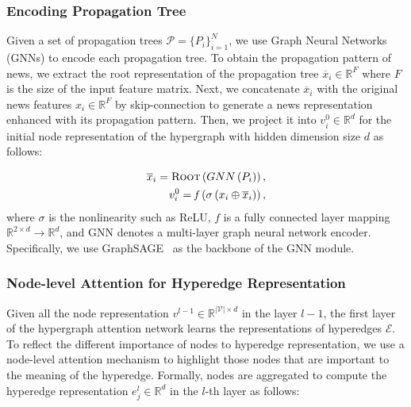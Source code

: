 \documentclass[conference]{IEEEtran}
\begin{document}
\subsubsection{Encoding Propagation Tree}
Given a set of propagation trees $\mathcal{P}=\{P_i\}_{i=1}^{\textit{N}}$, we use Graph Neural Networks (GNNs) to  encode each propagation tree. To obtain the propagation pattern of news, we extract the root representation of the propagation tree $\overline{x}_i \in \mathbb{R}^{\mathit{F}}$ where $\mathit{F}$ is the size of the input feature matrix. Next, we concatenate  $\overline{x}_i$ with the original news features $x_i \in \mathbb{R}^{\mathit{F}} $ by skip-connection to generate a news representation enhanced with its propagation pattern. Then, we project it into $v^0_i \in \mathbb{R}^{d}$ for the initial node representation of the hypergraph with hidden dimension size $\mathit{d}$ as follows: 

\begin{equation}
\begin{aligned}
\overline{x}_i =  \textsc{Root}\left(GNN\left( P_i \right)\right),\\
    v^{0}_{i} = \mathit{f} \left(\sigma \left( x_i \oplus\overline{x}_i \right)\right),
\end{aligned}
\end{equation}
where $\sigma$ is the nonlinearity such as ReLU, $\textit{f}$ is a fully connected layer mapping $\mathbb{R}^{2 \times  \mathit{d}} \rightarrow \mathbb{R}^{ \mathit{d}}$, and GNN denotes a multi-layer graph neural network encoder. Specifically, we use GraphSAGE~\cite{hamilton2017inductive} as the backbone of the GNN module.

\subsubsection{Node-level Attention for Hyperedge Representation}
Given all the node representation $v^{l-1} \in \mathbb{R}^{|\mathcal{V}|\times \mathit{d}}$ in the layer $\textit{l}-1$, the first layer of the hypergraph attention network learns the representations of hyperedges $\mathcal{E}$. To reflect the different importance of nodes to hyperedge representation, we use a node-level attention mechanism to highlight those nodes that are important to the meaning of the hyperedge. Formally, nodes are aggregated to compute the hyperedge representation $e^{l}_j \in \mathbb{R}^{\mathit{d}}$ in the $\textit{l}$-th layer as follows:
\end{document}
